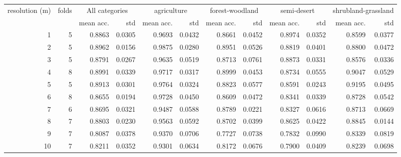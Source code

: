 \begin{tabular}{rrrrrrrrrrrr}
\toprule
resolution (m) &  folds & \multicolumn{2}{c}{All categories} & \multicolumn{2}{c}{agriculture} & \multicolumn{2}{c}{forest-woodland} & \multicolumn{2}{c}{semi-desert} & \multicolumn{2}{c}{shrubland-grassland} \\
           &  &     mean acc. &    std &                 mean acc. &    std &                     mean acc. &    std &                 mean acc. &    std &                         mean acc. &    std \\
\midrule
         1 &     5 &   0.8863 & 0.0305 &               0.9693 & 0.0432 &                   0.8661 & 0.0452 &               0.8974 & 0.0352 &                       0.8599 & 0.0377 \\
         2 &     5 &   0.8962 & 0.0156 &               0.9875 & 0.0280 &                   0.8951 & 0.0526 &               0.8819 & 0.0401 &                       0.8800 & 0.0472 \\
         3 &     5 &   0.8791 & 0.0267 &               0.9635 & 0.0519 &                   0.8713 & 0.0761 &               0.8873 & 0.0331 &                       0.8576 & 0.0336 \\
         4 &     8 &   0.8991 & 0.0339 &               0.9717 & 0.0317 &                   0.8999 & 0.0453 &               0.8734 & 0.0555 &                       0.9047 & 0.0529 \\
         5 &     5 &   0.8913 & 0.0301 &               0.9764 & 0.0324 &                   0.8823 & 0.0577 &               0.8591 & 0.0243 &                       0.9195 & 0.0495 \\
         6 &     8 &   0.8655 & 0.0194 &               0.9728 & 0.0450 &                   0.8609 & 0.0472 &               0.8341 & 0.0339 &                       0.8728 & 0.0542 \\
         7 &     6 &   0.8695 & 0.0321 &               0.9487 & 0.0588 &                   0.8789 & 0.0221 &               0.8327 & 0.0616 &                       0.8713 & 0.0669 \\
         8 &     7 &   0.8803 & 0.0230 &               0.9563 & 0.0592 &                   0.8702 & 0.0399 &               0.8625 & 0.0422 &                       0.8845 & 0.0144 \\
         9 &     7 &   0.8087 & 0.0378 &               0.9370 & 0.0706 &                   0.7727 & 0.0738 &               0.7832 & 0.0990 &                       0.8339 & 0.0819 \\
        10 &     7 &   0.8211 & 0.0352 &               0.9301 & 0.0634 &                   0.8172 & 0.0676 &               0.7900 & 0.0409 &                       0.8239 & 0.0698 \\

\end{tabular}
